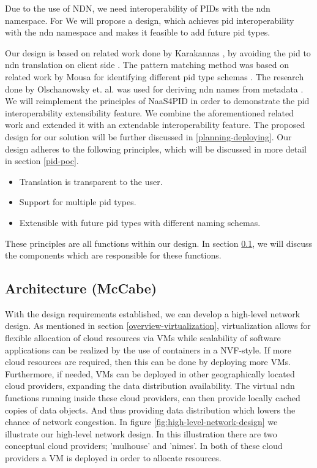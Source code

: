 Due to the use of NDN, we need interoperability of PIDs with the \gls{ndn} namespace. For 
We will propose a design, which achieves \gls{pid} interoperability with the \gls{ndn} namespace and makes it feasible to add future \gls{pid} types.



Our design is based on related work done by Karakannas \cite{icn-bd}, by avoiding the \gls{pid} to \gls{ndn} translation on client side \cite{icn-bd}. The pattern matching method was based on related work by Mousa for identifying different \gls{pid} type schemas \cite{ndn-app-aware}. The research done by Olschanowsky et. al. was used for deriving \gls{ndn} names from metadata \cite{ndn-man}.
We will reimplement the principles of NaaS4PID in order to demonstrate the \gls{pid} interoperability extensibility feature.
We combine the aforementioned related work and extended it with an extendable interoperability feature. The proposed design for our solution will be further discussed in \ref{planning-deploying}.
Our design adheres to the following principles, which will be discussed in more detail in section \ref{pid-poc}.
 
\begin{itemize}
    \item{Translation is transparent to the user.}
    \item{Support for multiple \gls{pid} types.}
    \item{Extensible with future \gls{pid} types with different naming schemas.}
\end{itemize}

These principles are all functions within our design. In section \ref{planning-architecture}, we will discuss the components which are responsible for these functions.

\subsection{Architecture (McCabe)}
\label{planning-architecture}
With the design requirements established, we can develop a high-level network design. As mentioned in section \ref{overview-virtualization}, virtualization allows for flexible allocation of cloud resources via VMs while scalability of software applications can be realized by the use of containers in a NVF-style. If more cloud resources are required, then this can be done by deploying more VMs. Furthermore, if needed, VMs can be deployed in other geographically located cloud providers, expanding the data distribution availability. The virtual \gls{ndn} functions running inside these cloud providers, can then provide locally cached copies of data objects. And thus providing data distribution which lowers the chance of network congestion. In figure \ref{fig:high-level-network-design} we illustrate our high-level network design. In this illustration there are two conceptual cloud providers; 'mulhouse' and 'nimes'. In both of these cloud providers a VM is deployed in order to allocate resources.

